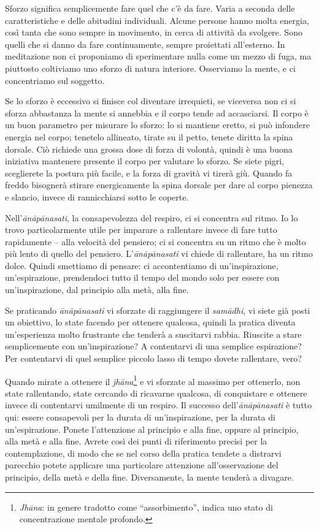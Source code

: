 
Sforzo significa semplicemente fare quel che c'è da fare. Varia a
seconda delle caratteristiche e delle abitudini individuali. Alcune
persone hanno molta energia, così tanta che sono sempre in movimento, in
cerca di attività da svolgere. Sono quelli che si danno da fare
continuamente, sempre proiettati all'esterno. In meditazione non ci
proponiamo di sperimentare nulla come un mezzo di fuga, ma piuttosto
coltiviamo uno sforzo di natura interiore. Osserviamo la mente, e ci
concentriamo sul soggetto.

Se lo sforzo è eccessivo si finisce col diventare irrequieti, se
viceversa non ci si sforza abbastanza la mente si annebbia e il corpo
tende ad accasciarsi. Il corpo è un buon parametro per misurare lo
sforzo: lo si mantiene eretto, si può infondere energia nel corpo;
tenetelo allineato, tirate su il petto, tenete diritta la spina dorsale.
Ciò richiede una grossa dose di forza di volontà, quindi è una buona
iniziativa mantenere presente il corpo per valutare lo sforzo. Se siete
pigri, sceglierete la postura più facile, e la forza di gravità vi
tirerà giù. Quando fa freddo bisognerà stirare energicamente la spina
dorsale per dare al corpo pienezza e slancio, invece di rannicchiarsi
sotto le coperte.

Nell'\textit{ānāpānasati}, la consapevolezza del respiro, ci si concentra sul
ritmo. Io lo trovo particolarmente utile per imparare a rallentare
invece di fare tutto rapidamente – alla velocità del pensiero; ci si
concentra su un ritmo che è molto più lento di quello del pensiero.
L'\textit{ānāpānasati} vi chiede di rallentare, ha un ritmo dolce. Quindi
smettiamo di pensare: ci accontentiamo di un'inspirazione,
un'espirazione, prendendoci tutto il tempo del mondo solo per essere con
un'inspirazione, dal principio alla metà, alla fine.

Se praticando \textit{ānāpānasati} vi sforzate di raggiungere il \textit{samādhi}, vi
siete già posti un obiettivo, lo state facendo per ottenere qualcosa,
quindi la pratica diventa un'esperienza molto frustrante che tenderà a
suscitarvi rabbia. Riuscite a stare semplicemente con un'inspirazione? A
contentarvi di una semplice espirazione? Per contentarvi di quel
semplice piccolo lasso di tempo dovete rallentare, vero?

Quando mirate a ottenere il \textit{jhāna}\footnote{\textit{Jhāna}: in genere tradotto come ``assorbimento'', indica
uno stato di concentrazione mentale profondo.} e vi sforzate al massimo
per ottenerlo, non state rallentando, state cercando di ricavarne
qualcosa, di conquistare e ottenere invece di contentarvi umilmente di
un respiro. Il successo dell'\textit{ānāpānasati} è tutto qui: essere consapevoli
per la durata di un'inspirazione, per la durata di un'espirazione.
Ponete l'attenzione al principio e alla fine, oppure al principio, alla
metà e alla fine. Avrete così dei punti di riferimento precisi per la
contemplazione, di modo che se nel corso della pratica tendete a
distrarvi parecchio potete applicare una particolare attenzione
all'osservazione del principio, della metà e della fine. Diversamente,
la mente tenderà a divagare.

